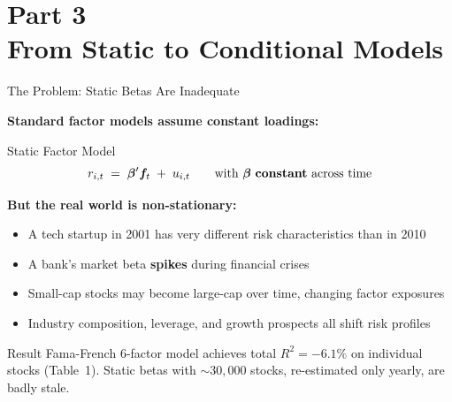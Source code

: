 \documentclass[aspectratio=169]{beamer}
\newcommand{\bbeta}{\bm{\beta}}
\newcommand{\bff}{\bm{f}}
\begin{document}
\section{Part 3\\From Static to Conditional Models}
%
\begin{frame}{The Problem: Static Betas Are Inadequate}

\textbf{Standard factor models assume constant loadings:}

\begin{block}{Static Factor Model}
\vspace{-0.5em}
\[
  r_{i,t} \;=\; \bbeta' \bff_t \;+\; u_{i,t} \qquad \text{with } \bbeta \text{ \textbf{constant} across time}
\]
\vspace{-1em}
\end{block}

\bigskip
\textbf{But the real world is non-stationary:}
\begin{itemize}
  \item A tech startup in 2001 has very different risk characteristics than in 2010
  \item A bank's market beta \textbf{spikes} during financial crises
  \item Small-cap stocks may become large-cap over time, changing factor exposures
  \item Industry composition, leverage, and growth prospects all shift risk profiles
\end{itemize}

\begin{alertblock}{Result}
Fama-French 6-factor model achieves total $R^2 = -6.1\%$ on individual stocks (Table~1).
Static betas with ${\sim}30{,}000$ stocks, re-estimated only yearly, are badly stale.
\end{alertblock}

\end{frame}
%
%
\end{document}
